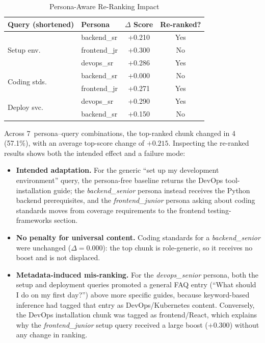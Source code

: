 \documentclass[conference]{IEEEtran}
\begin{document}
\begin{table}[htbp]
\centering
\caption{Persona-Aware Re-Ranking Impact}
\label{tab:persona}
\begin{tabular}{l l c c}
\toprule
\textbf{Query (shortened)} & \textbf{Persona} & \textbf{$\Delta$ Score} & \textbf{Re-ranked?} \\
\midrule
\multirow{3}{*}{Setup env.} & backend\_sr & +0.210 & Yes \\
 & frontend\_jr & +0.300 & No \\
 & devops\_sr & +0.286 & Yes \\
\midrule
\multirow{2}{*}{Coding stds.} & backend\_sr & +0.000 & No \\
 & frontend\_jr & +0.271 & Yes \\
\midrule
\multirow{2}{*}{Deploy svc.} & devops\_sr & +0.290 & Yes \\
 & backend\_sr & +0.150 & No \\
\bottomrule
\end{tabular}
\end{table}

Across 7~persona--query combinations, the top-ranked chunk changed in 4 (57.1\%), with an average top-score change of $+0.215$. Inspecting the re-ranked results shows both the intended effect and a failure mode:

\begin{itemize}
    \item \textbf{Intended adaptation.} For the generic ``set up my development environment'' query, the persona-free baseline returns the DevOps tool-installation guide; the \textit{backend\_senior} persona instead receives the Python backend prerequisites, and the \textit{frontend\_junior} persona asking about coding standards moves from coverage requirements to the frontend testing-frameworks section.
    \item \textbf{No penalty for universal content.} Coding standards for a \textit{backend\_senior} were unchanged ($\Delta = 0.000$): the top chunk is role-generic, so it receives no boost and is not displaced.
    \item \textbf{Metadata-induced mis-ranking.} For the \textit{devops\_senior} persona, both the setup and deployment queries promoted a general FAQ entry (``What should I do on my first day?'') above more specific guides, because keyword-based inference had tagged that entry as DevOps/Kubernetes content. Conversely, the DevOps installation chunk was tagged as frontend/React, which explains why the \textit{frontend\_junior} setup query received a large boost ($+0.300$) without any change in ranking.
\end{itemize}
\end{document}
